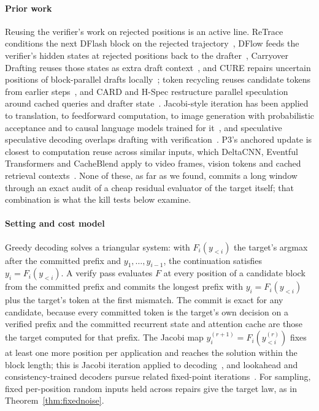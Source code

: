 \paragraph{Prior work} Reusing the verifier's work on rejected positions is an active line. ReTrace conditions the next DFlash block on the rejected trajectory~\cite{retrace2026}, DFlow feeds the verifier's hidden states at rejected positions back to the drafter~\cite{dflow}, Carryover Drafting reuses those states as extra draft context~\cite{carryover2026}, and CURE repairs uncertain positions of block-parallel drafts locally~\cite{cure2026}; token recycling reuses candidate tokens from earlier steps~\cite{tokenrecycling2024}, and CARD and H-Spec restructure parallel speculation around cached queries and drafter state~\cite{card2025,hspec2026}. Jacobi-style iteration has been applied to translation, to feedforward computation, to image generation with probabilistic acceptance and to causal language models trained for it~\cite{santilli2023jacobi,song2021parallel,sjd2025,so2026scd,hu2026jacobiforcing}, and speculative speculative decoding overlaps drafting with verification~\cite{specspec}. P3's anchored update is closest to computation reuse across similar inputs, which DeltaCNN, Eventful Transformers and CacheBlend apply to video frames, vision tokens and cached retrieval contexts~\cite{deltacnn2022,eventful2023,cacheblend2025}. None of these, as far as we found, commits a long window through an exact audit of a cheap residual evaluator of the target itself; that combination is what the kill tests below examine.

\paragraph{Setting and cost model}\label{sec:repair-model} Greedy decoding solves a triangular system: with $F_i(y_{<i})$ the target's argmax after the committed prefix and $y_1,\dots,y_{i-1}$, the continuation satisfies $y_i=F_i(y_{<i})$. A verify pass evaluates $F$ at every position of a candidate block from the committed prefix and commits the longest prefix with $y_i=F_i(y_{<i})$ plus the target's token at the first mismatch. The commit is exact for any candidate, because every committed token is the target's own decision on a verified prefix and the committed recurrent state and attention cache are those the target computed for that prefix. The Jacobi map $y^{(r+1)}_i=F_i(y^{(r)}_{<i})$ fixes at least one more position per application and reaches the solution within the block length; this is Jacobi iteration applied to decoding~\cite{song2021parallel,santilli2023jacobi}, and lookahead and consistency-trained decoders pursue related fixed-point iterations~\cite{lookahead,cllm}. For sampling, fixed per-position random inputs held across repairs give the target law, as in Theorem~\ref{thm:fixednoise}.

